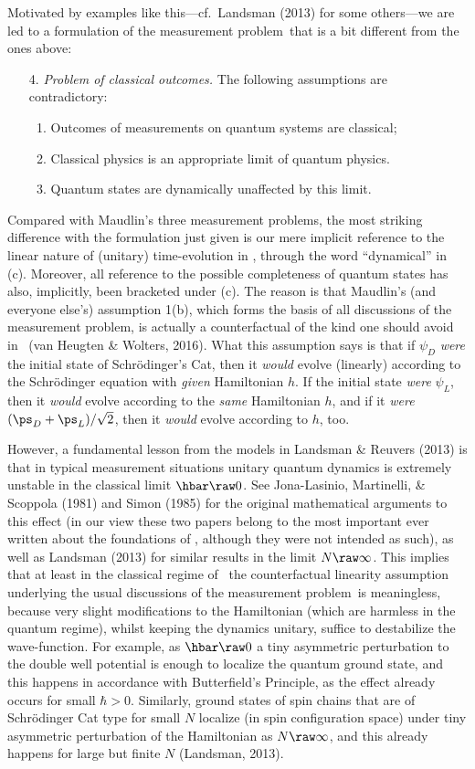 \documentclass[12pt]{article}
\newcommand{\mmp}{measurement problem}
\begin{document}
Motivated by examples like this---cf.\ Landsman (2013) for some others---we are led to a  formulation of the \mmp\ that is a bit different from the ones above:
\begin{enumerate}
\item[4.] \emph{Problem of classical outcomes.} The following assumptions are contradictory:
\begin{enumerate}
\item Outcomes of measurements on quantum systems are classical;
\item Classical physics is an appropriate limit of quantum physics.
\item Quantum states are dynamically unaffected by this limit.
\end{enumerate}
\end{enumerate}

Compared with Maudlin's three \mmp s, the most striking difference with the formulation just given is our mere implicit reference to the linear nature of (unitary) time-evolution in \qm, through the word ``dynamical'' in (c). Moreover, all reference to the possible completeness of quantum states has also, implicitly, been bracketed under (c). The reason  is that Maudlin's (and everyone else's) assumption 1(b), which  forms the basis of all discussions of the \mmp, is actually a counterfactual of the kind one should avoid in \qm\ (van Heugten \& Wolters, 2016). What this assumption says is that if $\psi_D$ \emph{were} the initial state of Schr\"{o}dinger's Cat, then it \emph{would} evolve (linearly) according to the  Schr\"{o}dinger equation with \emph{given} Hamiltonian $h$. If the initial state  \emph{were} $\psi_L$, then it  \emph{would} evolve according to the \emph{same} Hamiltonian $h$, and 
if it  \emph{were} $(\ps_D+\ps_L)/\sqrt{2}$, then it  \emph{would} evolve according to $h$, too.

 However, a fundamental lesson from the models in Landsman \& Reuvers (2013)  is that in typical measurement situations
unitary quantum dynamics is extremely unstable in the classical limit $\hbar\raw 0$. See Jona-Lasinio, Martinelli, \& Scoppola (1981) and Simon (1985) for the original mathematical arguments to this effect (in our view these two papers belong to the most important ever written about the foundations of \qm, although they were not intended as such), as well as
 Landsman (2013) for similar results in the limit $N\raw\infty$. 
 This implies that at least in the classical regime of \qm\ the counterfactual linearity assumption underlying the usual discussions of the \mmp\  is meaningless, because very slight modifications to the Hamiltonian (which are harmless in the quantum regime), whilst keeping the dynamics unitary, suffice to destabilize the wave-function. For example, as $\hbar\raw 0$ a tiny asymmetric perturbation to the double well potential is enough to localize the quantum ground state, and this happens in accordance with Butterfield's Principle, as the effect already occurs for small $\hbar>0$. Similarly, ground states of spin chains that are of  Schr\"{o}dinger Cat type for small $N$ localize (in spin configuration space) under tiny 
  asymmetric perturbation of the Hamiltonian as $N\raw\infty$, and this already happens for large but finite $N$ (Landsman, 2013). 
 
\end{document}
